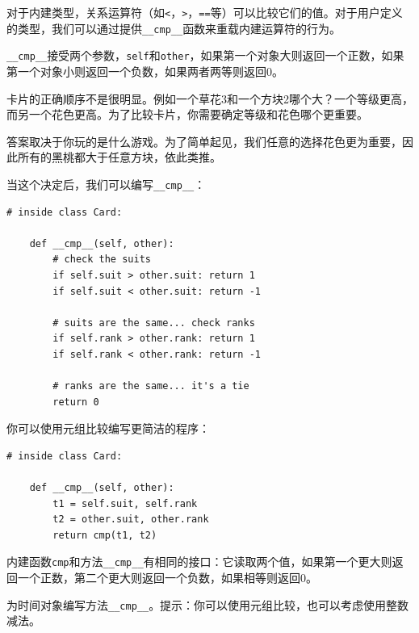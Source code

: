 对于内建类型，关系运算符（如{\tt <}，{\tt >}，{\tt ==}等）可以比较它们的值。对于用户定义的类型，我们可以通过提供\verb"__cmp__"函数来重载内建运算符的行为。


\verb"__cmp__"接受两个参数，{\tt self}和{\tt other}，如果第一个对象大则返回一个正数，如果第一个对象小则返回一个负数，如果两者两等则返回0。


卡片的正确顺序不是很明显。例如一个草花3和一个方块2哪个大？一个等级更高，而另一个花色更高。为了比较卡片，你需要确定等级和花色哪个更重要。

答案取决于你玩的是什么游戏。为了简单起见，我们任意的选择花色更为重要，因此所有的黑桃都大于任意方块，依此类推。


当这个决定后，我们可以编写\verb"__cmp__"：

\beforeverb
\begin{verbatim}
# inside class Card:

    def __cmp__(self, other):
        # check the suits
        if self.suit > other.suit: return 1
        if self.suit < other.suit: return -1

        # suits are the same... check ranks
        if self.rank > other.rank: return 1
        if self.rank < other.rank: return -1

        # ranks are the same... it's a tie
        return 0    
\end{verbatim}
\afterverb
%
你可以使用元组比较编写更简洁的程序：


\beforeverb
\begin{verbatim}
# inside class Card:

    def __cmp__(self, other):
        t1 = self.suit, self.rank
        t2 = other.suit, other.rank
        return cmp(t1, t2)
\end{verbatim}
\afterverb
%
内建函数{\tt cmp}和方法\verb"__cmp__"有相同的接口：它读取两个值，如果第一个更大则返回一个正数，第二个更大则返回一个负数，如果相等则返回0。



\begin{ex}
为时间对象编写方法\verb"__cmp__"。提示：你可以使用元组比较，也可以考虑使用整数减法。



\end{ex}



